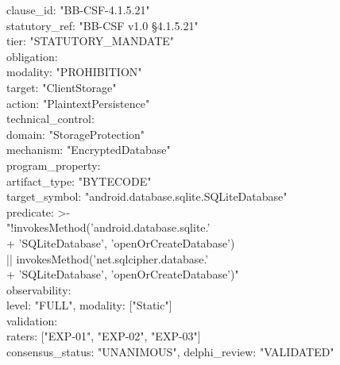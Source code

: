 \begin{tcolorbox}[colback=gray!3!white,colframe=gray!50!black,arc=1.2mm,boxrule=0.6pt,left=2mm,right=2mm,top=1.5mm,bottom=1.5mm,fonttitle=\bfseries\sffamily\footnotesize,coltitle=black!90!white,colbacktitle=gray!15!white,titlerule=0.4pt,title={Declarative YAML Schema Example (BB-CSF Section 4.1.5.21)},fontupper=\fontsize{6.5pt}{7.8pt}\selectfont\ttfamily]
clause\_id: "BB-CSF-4.1.5.21" \\
statutory\_ref: "BB-CSF v1.0 §4.1.5.21" \\
tier: "STATUTORY\_MANDATE" \\
obligation: \\
\hspace*{2mm} modality: "PROHIBITION" \\
\hspace*{2mm} target: "ClientStorage" \\
\hspace*{2mm} action: "PlaintextPersistence" \\
technical\_control: \\
\hspace*{2mm} domain: "StorageProtection" \\
\hspace*{2mm} mechanism: "EncryptedDatabase" \\
program\_property: \\
\hspace*{2mm} artifact\_type: "BYTECODE" \\
\hspace*{2mm} target\_symbol: "android.database.sqlite.SQLiteDatabase" \\
\hspace*{2mm} predicate: >- \\
\hspace*{4mm} "!invokesMethod('android.database.sqlite.' \\
\hspace*{6mm}   + 'SQLiteDatabase', 'openOrCreateDatabase') \\
\hspace*{4mm}  || invokesMethod('net.sqlcipher.database.' \\
\hspace*{6mm}   + 'SQLiteDatabase', 'openOrCreateDatabase')" \\
observability: \\
\hspace*{2mm} level: "FULL", modality: ["Static"] \\
validation: \\
\hspace*{2mm} raters: ["EXP-01", "EXP-02", "EXP-03"] \\
\hspace*{2mm} consensus\_status: "UNANIMOUS", delphi\_review: "VALIDATED"
\end{tcolorbox}
